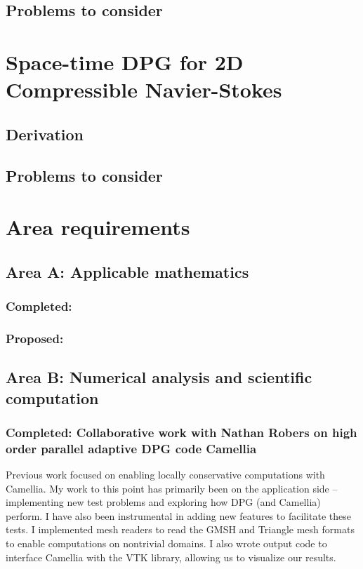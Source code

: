 \documentclass[12pt]{report}
\begin{document}
\subsection{Problems to consider}


\section{Space-time DPG for 2D Compressible Navier-Stokes}

\subsection{Derivation}

\subsection{Problems to consider}


\section{Area requirements}

\subsection{Area A: Applicable mathematics}
\subsubsection*{Completed:}
\subsubsection*{Proposed:}

\subsection{Area B: Numerical analysis and scientific computation}
\subsubsection*{Completed: Collaborative work with Nathan Robers on high order parallel adaptive DPG code Camellia}
Previous work focused on enabling locally conservative computations with Camellia. My work to this point has primarily been on the application side -- implementing new test problems and exploring how DPG (and Camellia) perform. I have also been instrumental in adding new features to facilitate these tests. I implemented mesh readers to read the GMSH and Triangle mesh formats to enable computations on nontrivial domains. I also wrote output code to interface Camellia with the VTK library, allowing us to visualize our results.
\end{document}
